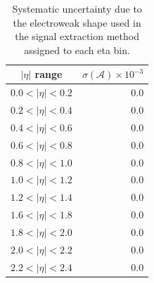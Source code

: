 \begin{table}[htb]
\begin{center}
\begin{tabular}{cr}
\hline
$|\eta|$ range & $\sigma(\mathcal{A}) \times 10^{-3}$\\
\hline
\hline
$0.0<|\eta|<0.2$ & 0.0\\
$0.2<|\eta|<0.4$ & 0.0\\
$0.4<|\eta|<0.6$ & 0.0\\
$0.6<|\eta|<0.8$ & 0.0\\
$0.8<|\eta|<1.0$ & 0.0\\
$1.0<|\eta|<1.2$ & 0.0\\
$1.2<|\eta|<1.4$ & 0.0\\
$1.6<|\eta|<1.8$ & 0.0\\
$1.8<|\eta|<2.0$ & 0.0\\
$2.0<|\eta|<2.2$ & 0.0\\
$2.2<|\eta|<2.4$ & 0.0\\
\hline
\end{tabular}
\caption{\label{tab:systEWK}Systematic uncertainty due to the electroweak \MET shape used in the signal extraction method assigned to each eta bin.}
\end{center}
\end{table}


